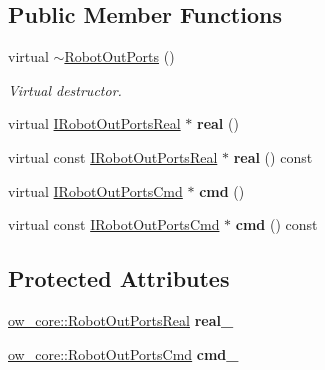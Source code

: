 \subsection*{Public Member Functions}
\begin{DoxyCompactItemize}
\item 
virtual \hyperlink{classow__core_1_1RobotOutPorts_aed43bf186fbc8bac85e9dd4896d696da}{$\sim$\+Robot\+Out\+Ports} ()\hypertarget{classow__core_1_1RobotOutPorts_aed43bf186fbc8bac85e9dd4896d696da}{}\label{classow__core_1_1RobotOutPorts_aed43bf186fbc8bac85e9dd4896d696da}

\begin{DoxyCompactList}\small\item\em Virtual destructor. \end{DoxyCompactList}\item 
virtual \hyperlink{classow__core_1_1IRobotOutPortsReal}{I\+Robot\+Out\+Ports\+Real} $\ast$ {\bfseries real} ()\hypertarget{classow__core_1_1RobotOutPorts_a519248bb84f2eca7ab681c5886c5b4ff}{}\label{classow__core_1_1RobotOutPorts_a519248bb84f2eca7ab681c5886c5b4ff}

\item 
virtual const \hyperlink{classow__core_1_1IRobotOutPortsReal}{I\+Robot\+Out\+Ports\+Real} $\ast$ {\bfseries real} () const \hypertarget{classow__core_1_1RobotOutPorts_a3149b8a0c58d40d0908ddf509d950165}{}\label{classow__core_1_1RobotOutPorts_a3149b8a0c58d40d0908ddf509d950165}

\item 
virtual \hyperlink{classow__core_1_1IRobotOutPortsCmd}{I\+Robot\+Out\+Ports\+Cmd} $\ast$ {\bfseries cmd} ()\hypertarget{classow__core_1_1RobotOutPorts_a398fa2e0702ec1cf92ce6b1b7ea8c919}{}\label{classow__core_1_1RobotOutPorts_a398fa2e0702ec1cf92ce6b1b7ea8c919}

\item 
virtual const \hyperlink{classow__core_1_1IRobotOutPortsCmd}{I\+Robot\+Out\+Ports\+Cmd} $\ast$ {\bfseries cmd} () const \hypertarget{classow__core_1_1RobotOutPorts_a33022afaf079177e3b4ec826c6581b29}{}\label{classow__core_1_1RobotOutPorts_a33022afaf079177e3b4ec826c6581b29}

\end{DoxyCompactItemize}
\subsection*{Protected Attributes}
\begin{DoxyCompactItemize}
\item 
\hyperlink{classow__core_1_1RobotOutPortsReal}{ow\+\_\+core\+::\+Robot\+Out\+Ports\+Real} {\bfseries real\+\_\+}\hypertarget{classow__core_1_1RobotOutPorts_ac4ee9ca0cdfbeb8046927dd09f34a8cd}{}\label{classow__core_1_1RobotOutPorts_ac4ee9ca0cdfbeb8046927dd09f34a8cd}

\item 
\hyperlink{classow__core_1_1RobotOutPortsCmd}{ow\+\_\+core\+::\+Robot\+Out\+Ports\+Cmd} {\bfseries cmd\+\_\+}\hypertarget{classow__core_1_1RobotOutPorts_a8b231e38fe976394b75872183edb447a}{}\label{classow__core_1_1RobotOutPorts_a8b231e38fe976394b75872183edb447a}

\end{DoxyCompactItemize}


